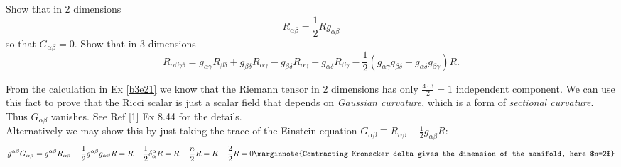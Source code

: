 \documentclass[10pt]{article}
\begin{document}
\begin{example}
	Show that in 2 dimensions
	$$
	R_{\alpha\beta}=\frac12 Rg_{\alpha\beta}
	$$
	so that $G_{\alpha\beta}=0$. Show that in 3 dimensions
	$$
	R_{\alpha\beta\gamma\delta} = g_{\alpha\gamma}R_{\beta\delta} + g_{\beta\delta}R_{\alpha\gamma} - g_{\beta\delta}R_{\alpha\gamma} - g_{\alpha\delta}R_{\beta\gamma} - \frac12(g_{\alpha\gamma}g_{\beta\delta}-g_{\alpha\delta}g_{\beta\gamma})R.
	$$
\end{example}
\sol From the calculation in Ex \ref{b3e21} we know that the Riemann tensor in 2 dimensions has only $\frac{4\cdot3}{2}=1$ independent component. We can use this fact to prove that the Ricci scalar is just a scalar field that depends on \emph{Gaussian curvature}, which is a form of \emph{sectional curvature}. Thus $G_{\alpha\beta}$ vanishes. See Ref [1] Ex 8.44 for the details.\\
Alternatively we may show this by just taking the trace of the Einstein equation $G_{\alpha\beta} \equiv R_{\alpha\beta} -\frac12g_{\alpha\beta} R$:
$$
g^{\alpha\beta}G_{\alpha\beta} = g^{\alpha\beta}R_{\alpha\beta} -\frac12g^{\alpha\beta}g_{\alpha\beta} R = R-\frac12\delta^\alpha_\alpha R = R-\frac{n}{2}R = R-\frac{2}{2}R =0\marginnote{Contracting Kronecker delta gives the dimension of the manifold, here $n=2$}
$$
\end{document}
